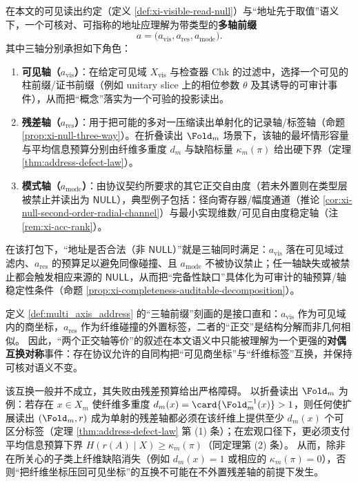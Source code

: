 \begin{definition}[完备地址作为多轴前缀]\label{def:multi_axis_address}
在本文的可见读出约定（定义 \ref{def:xi-visible-read-null}）与“地址先于取值”语义下，一个可核对、可指称的地址应理解为带类型的\textbf{多轴前缀}
\[
a=\bigl(a_{\mathrm{vis}},a_{\mathrm{res}},a_{\mathrm{mode}}\bigr).
\]
其中三轴分别承担如下角色：
\begin{enumerate}
  \item \textbf{可见轴（\(a_{\mathrm{vis}}\)）}：在给定可见域 \(X_{\mathrm{vis}}\) 与检查器 \(\mathrm{Chk}\) 的过滤中，选择一个可见的柱前缀/证书前缀（例如 unitary slice 上的相位参数 \(\theta\) 及其诱导的可审计事件），从而把“概念”落实为一个可验的投影读出。
  \item \textbf{残差轴（\(a_{\mathrm{res}}\)）}：用于把可能的多对一压缩读出单射化的记录轴/标签轴（命题 \ref{prop:xi-null-three-way}）。在折叠读出 \(\Fold_m\) 场景下，该轴的最坏情形容量与平均信息预算分别由纤维多重度 \(d_m\) 与缺陷标量 \(\kappa_m(\pi)\) 给出硬下界（定理 \ref{thm:address-defect-law}）。
  \item \textbf{模式轴（\(a_{\mathrm{mode}}\)）}：由协议契约所要求的其它正交自由度（若未外置则在类型层被禁止并读出为 \(\mathsf{NULL}\)），典型例子包括：径向寄存器/幅度通道（推论 \ref{cor:xi-null-second-order-radial-channel}）与最小实现维数/可见自由度稳定轴（注 \ref{rem:xi-acc-rank}）。
\end{enumerate}
\par
在该打包下，“地址是否合法（非 \(\mathsf{NULL}\)）”就是三轴同时满足：\(a_{\mathrm{vis}}\) 落在可见域过滤内、\(a_{\mathrm{res}}\) 的预算足以避免同像碰撞、且 \(a_{\mathrm{mode}}\) 不被协议禁止；任一轴缺失或被禁止都会触发相应来源的 \(\mathsf{NULL}\)，从而把“完备性缺口”具体化为可审计的轴预算/轴稳定性条件（命题 \ref{prop:xi-completeness-auditable-decomposition}）。
\end{definition}

\begin{remark}[对偶互换对称与残差预算障碍]\label{rem:xi-dual-swap-symmetry-defect}
定义 \ref{def:multi_axis_address} 的“三轴前缀”刻画的是接口直和：\(a_{\mathrm{vis}}\) 作为可见域内的商坐标，\(a_{\mathrm{res}}\) 作为纤维碰撞的外置标签，二者的“正交”是结构分解而非几何相似。
因此，“两个正交轴等价”的叙述在本文语义中只能被理解为一个更强的\textbf{对偶互换对称}事件：存在协议允许的自同构把“可见商坐标”与“纤维标签”互换，并保持可核对语义不变。
\par
该互换一般并不成立，其失败由残差预算给出严格障碍。
以折叠读出 \(\Fold_m\) 为例：若存在 \(x\in X_m\) 使纤维多重度 \(d_m(x)=\card{\Fold_m^{-1}(x)}>1\)，则任何使扩展读出 \((\Fold_m,r)\) 成为单射的残差轴都必须在该纤维上提供至少 \(d_m(x)\) 个可区分标签（定理 \ref{thm:address-defect-law} 第 (1) 条）；在宏观口径下，更必须支付平均信息预算下界 \(H(r(A)\mid X)\ge \kappa_m(\pi)\)（同定理第 (2) 条）。
从而，除非在所关心的子类上纤维缺陷消失（例如 \(d_m(x)=1\) 或相应的 \(\kappa_m(\pi)=0\)），否则“把纤维坐标压回可见坐标”的互换不可能在不外置残差轴的前提下发生。
\end{remark}
